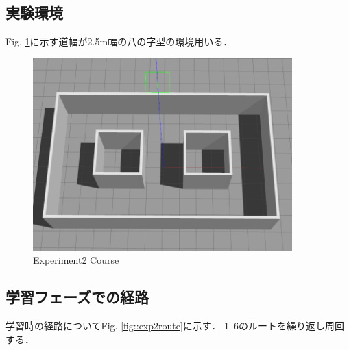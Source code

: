 \subsection{実験環境}
Fig. \ref{fig::hatinozi}に示す道幅が2.5m幅の八の字型の環境用いる．
\begin{figure}[h]
    \centering
    \includegraphics[width = 10cm]{./figs/coli.png}
    \caption{Experiment2 Course}
    \label{fig::hatinozi}
\end{figure}

\newpage
\subsection{学習フェーズでの経路}
学習時の経路についてFig. \ref{fig::exp2route}に示す．
1~6のルートを繰り返し周回する．

